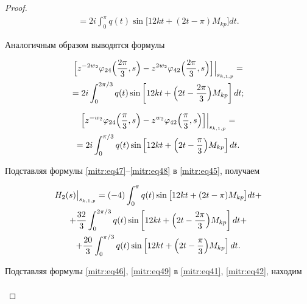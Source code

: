 \begin{proof}
\begin{multline}
=2i\int ^\pi_0 q(t)\sin\big[12kt+(2t-\pi)M_{kp}\big]dt.

\end{multline}

Аналогичным образом выводятся формулы

\begin{multline}

\label{mitr:eq48}

\Bigl[z^{-2w_2}\varphi_{24}\Bigl(\frac{2\pi}3,s\Bigr)- z^{2w_2}\varphi_{42}\Bigl(\frac{2\pi}3,s\Bigr)\Bigr]\Big|_{s_{k,1,p}}=\\

=

2i\int ^{2\pi/3}_0q(t)\sin\left[12kt+\Bigl(2t-\frac{2\pi}3\Bigr)M_{kp}\right]dt;

\end{multline}

\begin{multline}

\label{mitr:eq48}

\Bigl[z^{-w_2}\varphi_{24}\Bigl(\frac{\pi}3,s\Bigr)-

z^{w_2}\varphi_{42}\Bigl(\frac{\pi}3,s\Bigr)\Bigr]\Big|_{s_{k,1,p}}= \\=

2i\int ^{\pi/3}_0q(t)\sin\left[12kt+\Bigl(2t-\frac\pi3\Bigr)M_{kp}\right]dt.

\end{multline}

Подставляя формулы \eqref{mitr:eq47}--\eqref{mitr:eq48} в \eqref{mitr:eq45}, получаем

\begin{multline}

\label{mitr:eq49}

H_2(s)\big|_{s_{k,1,p}}=(-4)\int ^\pi_0 q(t)\sin\big[12kt+(2t-\pi)M_{kp}\big]dt+\\ +

\frac{32}3\int ^{2\pi/3}_0q(t)\sin\left[12kt+\Bigl(2t-\frac{2\pi}3\Bigr)M_{kp}\right]dt+\\+

\frac{20}3\int ^{\pi/3}_0q(t) \sin\left[12kt+\Bigl(2t-\frac\pi3\Bigr)M_{kp}\right]dt .

\end{multline}

Подставляя формулы \eqref{mitr:eq46}, \eqref{mitr:eq49} в \eqref{mitr:eq41}, \eqref{mitr:eq42}, находим

\begin{multline}


\end{multline}
\end{proof}
